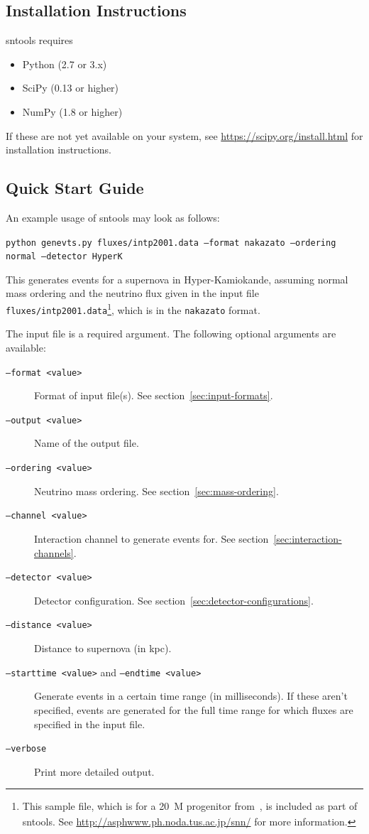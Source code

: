 \documentclass[11pt, oneside]{article}
\begin{document}
\subsection{Installation Instructions}

sntools requires
\begin{itemize}
\item Python (2.7 or 3.x)
\item SciPy (0.13 or higher)
\item NumPy (1.8 or higher)
\end{itemize}

If these are not yet available on your system, see \url{https://scipy.org/install.html} for installation instructions.


\subsection{Quick Start Guide}

An example usage of sntools may look as follows:

\texttt{python genevts.py fluxes/intp2001.data --format nakazato --ordering normal --detector HyperK}

This generates events for a supernova in Hyper-Kamiokande, assuming normal mass ordering and the neutrino flux given in the input file \texttt{fluxes/intp2001.data}\footnote{This sample file, which is for a \SI{20}{M_\odot} progenitor from~\cite{Nakazato2013}, is included as part of sntools. See \url{http://asphwww.ph.noda.tus.ac.jp/snn/} for more information.}, which is in the \texttt{nakazato} format.

The input file is a required argument. The following optional arguments are available:

\begin{description}
\item[\texttt{--format <value>}] Format of input file(s). See section~\ref{sec:input-formats}.
\item[\texttt{--output <value>}] Name of the output file.
\item[\texttt{--ordering <value>}] Neutrino mass ordering. See section~\ref{sec:mass-ordering}.
\item[\texttt{--channel <value>}] Interaction channel to generate events for. See section~\ref{sec:interaction-channels}.
\item[\texttt{--detector <value>}] Detector configuration. See section~\ref{sec:detector-configurations}.
\item[\texttt{--distance <value>}] Distance to supernova (in kpc).
\item[\texttt{--starttime <value>} and \texttt{--endtime <value>}] Generate events in a certain time range (in milliseconds). If these aren’t specified, events are generated for the full time range for which fluxes are specified in the input file.
\item[\texttt{--verbose}] Print more detailed output.
\end{description}
\end{document}
